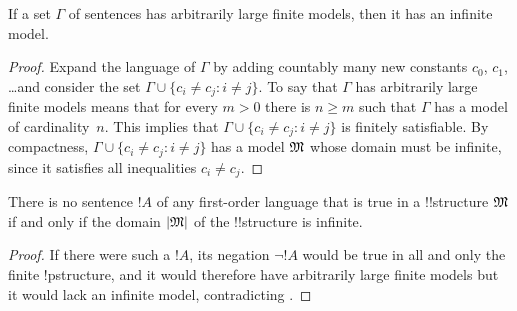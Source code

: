 \documentclass[../../include/open-logic-section]{subfiles}
\begin{document}

\begin{thm}
  If a set $\Gamma$ of sentences has arbitrarily large finite models,
  then it has an infinite model.
\end{thm}

\begin{proof}
  Expand the language of $\Gamma$ by adding countably many new
  constants $c_0$, $c_1$, \dots and consider the set $\Gamma \cup
  \{c_i \neq c_j : i \neq j\}$. To say that $\Gamma$ has arbitrarily
  large finite models means that for every $m >0$ there is $n\ge m$
  such that $\Gamma$ has a model of cardinality~$n$. This implies that
  $\Gamma \cup \{c_i \neq c_j : i \neq j\}$ is finitely
  satisfiable. By compactness, $\Gamma \cup \{c_i \neq c_j : i \neq
  j\}$ has a model $\mathfrak M$ whose domain must be infinite, since it
  satisfies all inequalities $c_i \neq c_j$.
\end{proof}

\begin{prop}
  There is no sentence $!A$ of any first-order language
  that is true in a !!{structure} $\mathfrak M$ if and only
  if the domain $\left| \mathfrak M \right|$ of the !!{structure} is infinite.
\end{prop}

\begin{proof}
  If there were such a $!A$, its negation $\lnot !A$ would
  be true in all and only the finite !p{structure}, and it would
  therefore have arbitrarily large finite models but it would lack an
  infinite model, contradicting .
\end{proof}
\end{document}
